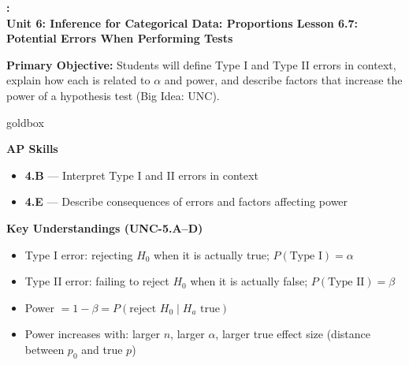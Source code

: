 \documentclass[10pt]{article}
\newcommand{\UnitNumberName}{Unit 6: Inference for Categorical Data: Proportions \quad}
\newcommand{\LessonNumberName}{Lesson 6.7: Potential Errors When Performing Tests}
\begin{document}
\begin{center}
    {\Large\bfseries \CourseName: \SchoolYear \\
    {\small\bfseries \UnitNumberName \LessonNumberName}}
\end{center}

\begin{tcolorbox}[colback=sky, colframe=navy, boxrule=0.9pt, arc=2mm,
    left=2mm, right=2mm, top=1.5mm, bottom=1.5mm]
    \textbf{Primary Objective:} Students will define Type I and Type II errors in context,
    explain how each is related to $\alpha$ and power, and describe factors that increase
    the power of a hypothesis test (Big Idea: UNC).
\end{tcolorbox}

\renewcommand{\arraystretch}{1.6}
\begin{skillbox}{goldbox}
    \begin{minipage}[t]{0.48\linewidth}\vspace{0pt}
        \textbf{AP Skills}
        \begin{itemize}[leftmargin=1.2em]
            \item \textbf{4.B} --- Interpret Type I and II errors in context
            \item \textbf{4.E} --- Describe consequences of errors and factors affecting power
        \end{itemize}
    \end{minipage}\hfill
    \begin{minipage}[t]{0.48\linewidth}\vspace{0pt}
        \textbf{Key Understandings (UNC-5.A--D)}
        \begin{itemize}[leftmargin=1.2em]
            \item Type I error: rejecting $H_0$ when it is actually true; $P(\text{Type I}) = \alpha$
            \item Type II error: failing to reject $H_0$ when it is actually false; $P(\text{Type II}) = \beta$
            \item Power $= 1 - \beta = P(\text{reject } H_0 \mid H_a \text{ true})$
            \item Power increases with: larger $n$, larger $\alpha$, larger true effect size (distance between $p_0$ and true $p$)
        \end{itemize}
    \end{minipage}
\end{skillbox}
\end{document}

